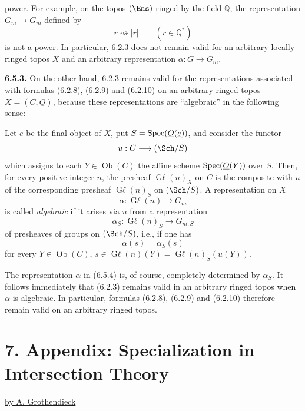 %

power. For example, on the topos \((\Ens)\) ringed by the field \(\mathbb Q\), the representation \(G_m\to G_m\) defined by
\[
 r\rightsquigarrow|r|\qquad(r\in\mathbb Q^*)
\]
is not a power. In particular, 6.2.3 does not remain valid for an arbitrary locally ringed topos \(X\) and an arbitrary representation \(\alpha:G\to G_m\).

\textbf{6.5.3.} On the other hand, 6.2.3 remains valid for the representations associated with formulas (6.2.8), (6.2.9) and (6.2.10) on an arbitrary ringed topos \(X=({C},\underline{O})\), because these representations are ``algebraic'' in the following sense:

Let \(\underline{e}\) be the final object of \(X\), put \(S=\operatorname{Spec}(\underline{O}(\underline{e}))\), and consider the functor
\[
 u:{C}\longrightarrow(\Sch/S)
\]
which assigns to each \(Y\in\operatorname{Ob}({C})\) the affine scheme \(\operatorname{Spec}(\underline{O}(Y))\) over \(S\). Then, for every positive integer \(n\), the presheaf \(\operatorname{G\ell}(n)_X\) on \({C}\) is the composite with \(u\) of the corresponding presheaf \(\operatorname{G\ell}(n)_S\) on \((\Sch/S)\). A representation on \(X\)
\begin{equation}\tag{6.5.4}
 \alpha:\operatorname{G\ell}(n)\longrightarrow G_m
\end{equation}
is called \emph{algebraic} if it arises via \(u\) from a representation
\begin{equation}\tag{6.5.5}
 \alpha_S:\operatorname{G\ell}(n)_S\longrightarrow G_{m,S}
\end{equation}
of presheaves of groups on \((\Sch/S)\), i.e., if one has
\[
 \alpha(s)=\alpha_S(s)
\]
for every \(Y\in\operatorname{Ob}({C})\), \(s\in\operatorname{G\ell}(n)(Y)=\operatorname{G\ell}(n)_S(u(Y))\).

The representation \(\alpha\) in (6.5.4) is, of course, completely determined by \(\alpha_S\). It follows immediately that (6.2.3) remains valid in an arbitrary ringed topos when \(\alpha\) is algebraic. In particular, formulas (6.2.8), (6.2.9) and (6.2.10) therefore remain valid on an arbitrary ringed topos.

%

\section*{7. Appendix: Specialization in Intersection Theory}
\begin{center}
\underline{by A. Grothendieck}
\end{center}


